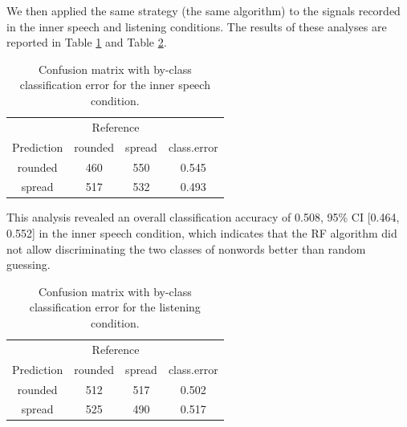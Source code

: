 \documentclass[a4paper,12pt,twoside,openright,oldfontcommands,final]{memoir}
\begin{document}
We then applied the same strategy (the same algorithm) to the signals recorded in the inner speech and listening conditions. The results of these analyses are reported in Table \ref{tab:CMinner} and Table \ref{tab:CMlistening}.

\begin{table}[H]
\begin{center}
\begin{threeparttable}
\caption{\label{tab:CMinner}Confusion matrix with by-class classification error for the inner speech condition.}
\begin{tabular}{cccc}
\toprule
 & \multicolumn{2}{c}{Reference}  &\\
\cmidrule(r){2-3}
Prediction & \multicolumn{1}{c}{rounded} & \multicolumn{1}{c}{spread} & \multicolumn{1}{c}{class.error}\\
\midrule
rounded & 460 & 550 & 0.545\\
spread & 517 & 532 & 0.493\\
\bottomrule
\end{tabular}
\end{threeparttable}
\end{center}
\end{table}

This analysis revealed an overall classification accuracy of 0.508, 95\% CI {[}0.464, 0.552{]} in the inner speech condition, which indicates that the RF algorithm did not allow discriminating the two classes of nonwords better than random guessing.

\begin{table}[H]
\begin{center}
\begin{threeparttable}
\caption{\label{tab:CMlistening}Confusion matrix with by-class classification error for the listening condition.}
\begin{tabular}{cccc}
\toprule
 & \multicolumn{2}{c}{Reference}  &\\
\cmidrule(r){2-3}
Prediction & \multicolumn{1}{c}{rounded} & \multicolumn{1}{c}{spread} & \multicolumn{1}{c}{class.error}\\
\midrule
rounded & 512 & 517 & 0.502\\
spread & 525 & 490 & 0.517\\
\bottomrule
\end{tabular}
\end{threeparttable}
\end{center}
\end{table}
\end{document}
